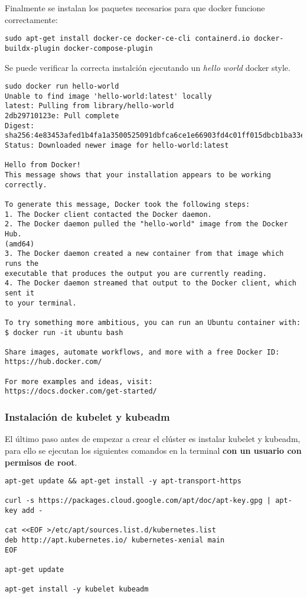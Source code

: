 \documentclass[../main.tex]{subfiles}
\begin{document}
Finalmente se instalan los paquetes necesarios para que docker funcione correctamente:
\begin{lstlisting}
sudo apt-get install docker-ce docker-ce-cli containerd.io docker-buildx-plugin docker-compose-plugin 
\end{lstlisting}
Se puede verificar la correcta instalción ejecutando un \textit{hello world} docker style.
\begin{lstlisting} 
sudo docker run hello-world
Unable to find image 'hello-world:latest' locally
latest: Pulling from library/hello-world
2db29710123e: Pull complete 
Digest: sha256:4e83453afed1b4fa1a3500525091dbfca6ce1e66903fd4c01ff015dbcb1ba33e
Status: Downloaded newer image for hello-world:latest

Hello from Docker!
This message shows that your installation appears to be working correctly.

To generate this message, Docker took the following steps:
1. The Docker client contacted the Docker daemon.
2. The Docker daemon pulled the "hello-world" image from the Docker Hub.
(amd64)
3. The Docker daemon created a new container from that image which runs the
executable that produces the output you are currently reading.
4. The Docker daemon streamed that output to the Docker client, which sent it
to your terminal.

To try something more ambitious, you can run an Ubuntu container with:
$ docker run -it ubuntu bash

Share images, automate workflows, and more with a free Docker ID:
https://hub.docker.com/

For more examples and ideas, visit:
https://docs.docker.com/get-started/
\end{lstlisting}

\subsubsection{Instalación de kubelet y kubeadm} 
El último paso antes de empezar a crear el clúster es instalar kubelet y kubeadm, para ello se ejecutan los siguientes comandos en la terminal \textbf{con un usuario con permisos de root}. 
\begin{lstlisting} 
apt-get update && apt-get install -y apt-transport-https

curl -s https://packages.cloud.google.com/apt/doc/apt-key.gpg | apt-key add -

cat <<EOF >/etc/apt/sources.list.d/kubernetes.list
deb http://apt.kubernetes.io/ kubernetes-xenial main
EOF

apt-get update

apt-get install -y kubelet kubeadm
\end{lstlisting}
\end{document}
